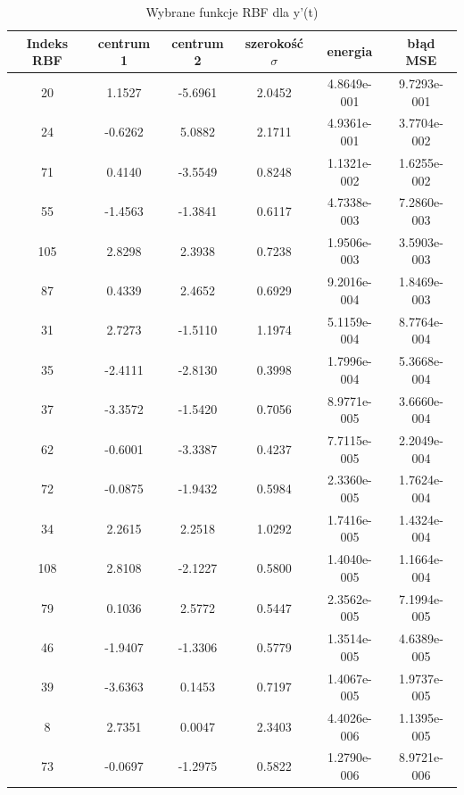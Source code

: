 \begin{table}[ht!]
\centering

\begin{tabular}{ |c| c| c| c| c| c| }
\hline
Indeks RBF & centrum 1 & centrum 2 & szerokość $\sigma$ & energia      & błąd MSE    \\ \hline    
    20     &  1.1527   &  -5.6961  &       2.0452       &  4.8649e-001 & 9.7293e-001 \\
    24     & -0.6262   &   5.0882  &       2.1711       &  4.9361e-001 & 3.7704e-002 \\
    71     &  0.4140   &  -3.5549  &       0.8248       &  1.1321e-002 & 1.6255e-002 \\
    55     & -1.4563   &  -1.3841  &       0.6117       &  4.7338e-003 & 7.2860e-003 \\
   105     &  2.8298   &   2.3938  &       0.7238       &  1.9506e-003 & 3.5903e-003 \\
    87     &  0.4339   &   2.4652  &       0.6929       &  9.2016e-004 & 1.8469e-003 \\
    31     &  2.7273   &  -1.5110  &       1.1974       &  5.1159e-004 & 8.7764e-004 \\
    35     & -2.4111   &  -2.8130  &       0.3998       &  1.7996e-004 & 5.3668e-004 \\
    37     & -3.3572   &  -1.5420  &       0.7056       &  8.9771e-005 & 3.6660e-004 \\
    62     & -0.6001   &  -3.3387  &       0.4237       &  7.7115e-005 & 2.2049e-004 \\
    72     & -0.0875   &  -1.9432  &       0.5984       &  2.3360e-005 & 1.7624e-004 \\
    34     &  2.2615   &   2.2518  &       1.0292       &  1.7416e-005 & 1.4324e-004 \\
   108     &  2.8108   &  -2.1227  &       0.5800       &  1.4040e-005 & 1.1664e-004 \\
    79     &  0.1036   &   2.5772  &       0.5447       &  2.3562e-005 & 7.1994e-005 \\
    46     & -1.9407   &  -1.3306  &       0.5779       &  1.3514e-005 & 4.6389e-005 \\
    39     & -3.6363   &   0.1453  &       0.7197       &  1.4067e-005 & 1.9737e-005 \\
     8     &  2.7351   &   0.0047  &       2.3403       &  4.4026e-006 & 1.1395e-005 \\
    73     & -0.0697   &  -1.2975  &       0.5822       &  1.2790e-006 & 8.9721e-006 \\
    \hline
\end{tabular}

\caption{Wybrane funkcje RBF dla y'(t)}
\label{tab:rbf_tabela_x2}
\end{table}

